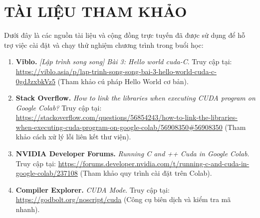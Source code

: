 \documentclass[12pt,a4paper]{article}
\begin{document}
\section{TÀI LIỆU THAM KHẢO}
Dưới đây là các nguồn tài liệu và cộng đồng trực tuyến đã được sử dụng để hỗ trợ việc cài đặt và chạy thử nghiệm chương trình trong buổi học:

\begin{enumerate}
    \item \textbf{Viblo.} \textit{[Lập trình song song] Bài 3: Hello world cuda-C}. Truy cập tại: \url{https://viblo.asia/p/lap-trinh-song-song-bai-3-hello-world-cuda-c-0gdJzxbkVz5} (Tham khảo cú pháp Hello World cơ bản).
    
    \item \textbf{Stack Overflow.} \textit{How to link the libraries when executing CUDA program on Google Colab?} Truy cập tại: \url{https://stackoverflow.com/questions/56854243/how-to-link-the-libraries-when-executing-cuda-program-on-google-colab/56908350#56908350} (Tham khảo cách xử lý lỗi liên kết thư viện).
    
    \item \textbf{NVIDIA Developer Forums.} \textit{Running C and ++ Cuda in Google Colab}. Truy cập tại: \url{https://forums.developer.nvidia.com/t/running-c-and-cuda-in-google-colab/237108} (Tham khảo quy trình cài đặt trên Colab).
    
    \item \textbf{Compiler Explorer.} \textit{CUDA Mode}. Truy cập tại: \url{https://godbolt.org/noscript/cuda} (Công cụ biên dịch và kiểm tra mã nhanh).
\end{enumerate}
\end{document}
